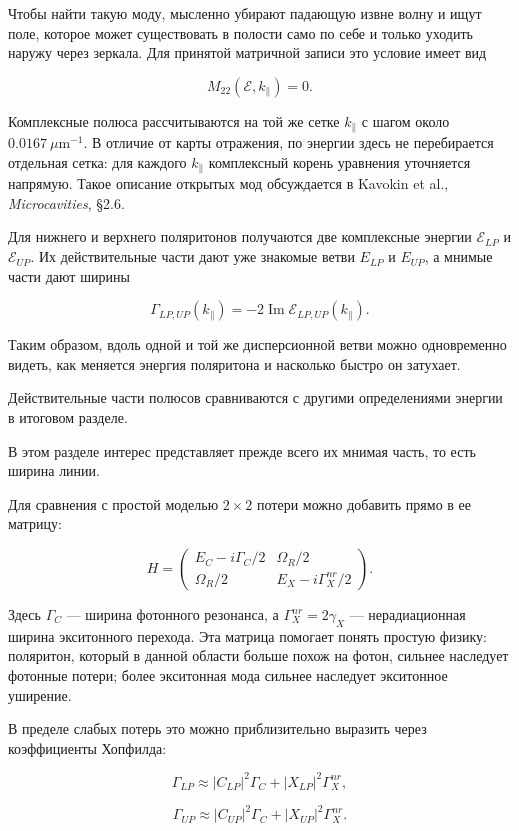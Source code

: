 \documentclass[12pt,a4paper]{article}
\begin{document}
Чтобы найти такую моду, мысленно убирают падающую извне волну и ищут поле, которое может существовать в полости само по себе и только уходить наружу через зеркала. Для принятой матричной записи это условие имеет вид

\[
M_{22}(\mathcal E,k_\parallel)=0.
\]

Комплексные полюса рассчитываются на той же сетке $k_\parallel$ с шагом около $0.0167\ \mu\mathrm m^{-1}$. В отличие от карты отражения, по энергии здесь не перебирается отдельная сетка: для каждого $k_\parallel$ комплексный корень уравнения уточняется напрямую. Такое описание открытых мод обсуждается в Kavokin et al., \textit{Microcavities}, \S2.6.

Для нижнего и верхнего поляритонов получаются две комплексные энергии $\mathcal E_{LP}$ и $\mathcal E_{UP}$. Их действительные части дают уже знакомые ветви $E_{LP}$ и $E_{UP}$, а мнимые части дают ширины

\[
\Gamma_{LP,UP}(k_\parallel)
=-2\operatorname{Im}\mathcal E_{LP,UP}(k_\parallel).
\]

Таким образом, вдоль одной и той же дисперсионной ветви можно одновременно видеть, как меняется энергия поляритона и насколько быстро он затухает.

Действительные части полюсов сравниваются с другими определениями энергии в итоговом разделе.

 В этом разделе интерес представляет прежде всего их мнимая часть, то есть ширина линии.

Для сравнения с простой моделью $2\times2$ потери можно добавить прямо в ее матрицу:

\[
H=
\begin{pmatrix}
E_C-i\Gamma_C/2 & \Omega_R/2\\
\Omega_R/2 & E_X-i\Gamma_X^{nr}/2
\end{pmatrix}.
\]

Здесь $\Gamma_C$ --- ширина фотонного резонанса, а $\Gamma_X^{nr}=2\gamma_X$ --- нерадиационная ширина экситонного перехода. Эта матрица помогает понять простую физику: поляритон, который в данной области больше похож на фотон, сильнее наследует фотонные потери; более экситонная мода сильнее наследует экситонное уширение.

В пределе слабых потерь это можно приблизительно выразить через коэффициенты Хопфилда:

\[
\Gamma_{LP}
\approx
|C_{LP}|^2\Gamma_C
+
|X_{LP}|^2\Gamma_X^{nr},
\]

\[
\Gamma_{UP}
\approx
|C_{UP}|^2\Gamma_C
+
|X_{UP}|^2\Gamma_X^{nr}.
\]
\end{document}
